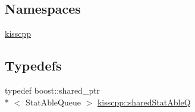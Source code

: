 \subsection*{Namespaces}
\begin{DoxyCompactItemize}
\item 
\hyperlink{a00089}{kisscpp}
\end{DoxyCompactItemize}
\subsection*{Typedefs}
\begin{DoxyCompactItemize}
\item 
typedef boost\-::shared\-\_\-ptr\\*
$<$ Stat\-Able\-Queue $>$ \hyperlink{a00089_a141592ccd82280d2692ca3b9b490faab}{kisscpp\-::shared\-Stat\-Able\-Q}
\end{DoxyCompactItemize}
